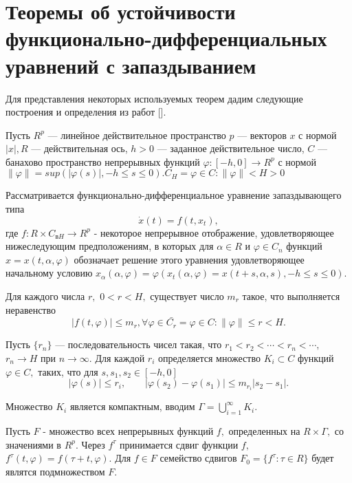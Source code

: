 \section{Теоремы об устойчивости функционально-дифференциальных уравнений с запаздыванием} \label{p11}

	Для представления некоторых используемых теорем дадим следующие построения и определения из работ [].

	Пусть $R^p$ --- линейное действительное пространство $p$ --- векторов $x$ с нормой $|x|,  R$ 
	--- действительная ось, $h>0$ --- заданное действительное число, $C$ --- банахово пространство
	непрерывных функций $\varphi:[-h,0] \rightarrow R^p$ с нормой $\|\varphi\|=sup(|\varphi(s)|,-h \le s \le 0). C_H = {\varphi \in C : \| \varphi \| < H > 0}$
	
	Рассматривается функционально-дифференциальное
	уравнение запаздывающего типа
	\begin{equation}
	\dot x(t) = f(t,x_t), \label{1.1'}
	\end{equation}
	где $f: R \times C_{вH}\to R^p$ - некоторое непрерывное отображение,
	удовлетворяющее  нижеследующим предположениям, в которых для $\alpha \in R$ и $\varphi \in C_n$ функций $x = x(t, \alpha, \varphi)$ обозначает решение этого уравнения удовлетворяющее начальному условию $x_{\alpha} (\alpha, \varphi) = \varphi (x_t(\alpha, \varphi) = x(t + s, \alpha, s), -h \le s \le 0)$.
	
	\begin{definition}\label{AS1} Для  каждого  числа $r,$ $0<r<H,$
		существует число $m_r$ такое, что выполняется неравенство
		\begin{equation}\label{1.2'}
		\left| f(t, \varphi) \right|\le m_r, \forall \varphi \in \bar{C_r} = {\varphi \in C: \| \varphi \| \le r < H}.
		\end{equation}
	\end{definition}
	
	Пусть $\{r_n\}$ ---
	последовательность чисел такая, что $r_1<r_2<\cdots <r_n<\cdots, $
	$r_n\to H$ при $n\to \infty .$ Для каждой $r_i$ определяется
	множество $K_i\subset C$ функций $\varphi \in C,$ таких, что
	для $s, s_1,s_2 \in [-h,0]$  $$|\varphi (s)|\le r_i, \qquad
	|\varphi (s_2)-\varphi (s_1)|\le m_{r_i} |s_2-s_1|.$$
	
	Множество $K_i$ является компактным, вводим $\Gamma =\bigcup\limits_{i=1}^{\infty } {K_i}.$
	
	Пусть $F$ - множество всех непрерывных функций $f,$
	определенных на $R \times \Gamma,$ со значениями в $R^p.$
	Через $f^{\tau }$ принимается сдвиг функции $f,$ $f^{\tau }(t,\varphi )=f(\tau +t,\varphi ).$
	Для $f\in F$ семейство сдвигов $F_0=\{f^{\tau }:\tau\in
	R\}$ будет являтся подмножеством $F.$
	

